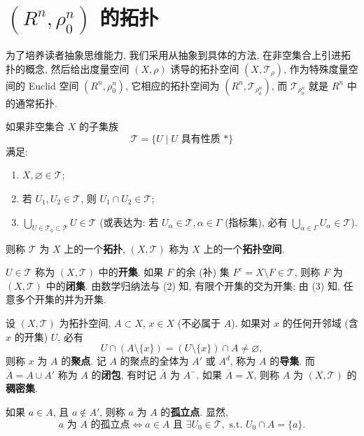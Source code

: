 
\section{\texorpdfstring{$(R^n, \rho_0^n)$}{(R^n, ρ_0^n)} 的拓扑}

为了培养读者抽象思维能力, 我们采用从抽象到具体的方法, 在非空集合上引进拓扑的概念, 然后给出度量空间 $(X, \rho)$ 诱导的拓扑空间 $(X, \mathcal{T}_{\rho})$, 作为特殊度量空间的 Euclid 空间 $(R^n, \rho_0^n)$, 它相应的拓扑空间为 $(R^n, \mathcal{T}_{\rho_0^n})$, 而 $\mathcal{T}_{\rho_0^n}$ 就是 $R^n$ 中的通常拓扑.

\begin{definition}\label{def:7.1.1}
如果非空集合 $X$ 的子集族
\[
  \mathcal{T}=\{U \mid U\text{ 具有性质 } *\}
\]
满足:
\begin{enumerate}
  \item $X, \varnothing \in \mathcal{T}$;
  \item 若 $U_1, U_2 \in \mathcal{T}$, 则 $U_1 \cap U_2 \in \mathcal{T}$;
  \item $\bigcup_{U \in \mathcal{T}_0 \subset \mathcal{T}} U \in \mathcal{T}$ (或表达为: 若 $U_\alpha \in \mathcal{T}, \alpha \in \Gamma$ (指标集), 必有 $\bigcup_{\alpha \in \Gamma} U_\alpha \in \mathcal{T}$).
\end{enumerate}
则称 $\mathcal{T}$ 为 $X$ 上的一个\textbf{拓扑}, $(X, \mathcal{T})$ 称为 $X$ 上的一个\textbf{拓扑空间}.

$U \in \mathcal{T}$ 称为 $(X, \mathcal{T})$ 中的\textbf{开集}. 如果 $F$ 的余 (补) 集 $F^c = X \setminus F \in \mathcal{T}$, 则称 $F$ 为 $(X, \mathcal{T})$ 中的\textbf{闭集}. 由数学归纳法与 (2) 知, 有限个开集的交为开集; 由 (3) 知, 任意多个开集的并为开集.
\end{definition}

\begin{definition}\label{def:7.1.2}
设 $(X, \mathcal{T})$ 为拓扑空间, $A \subset X$, $x \in X$ (不必属于 $A$). 如果对 $x$ 的任何开邻域 (含 $x$ 的开集) $U$, 必有
\[
  U \cap (A \setminus \{x\}) = (U \setminus \{x\}) \cap A \neq \varnothing,
\]
则称 $x$ 为 $A$ 的\textbf{聚点}. 记 $A$ 的聚点的全体为 $A'$ 或 $A^d$, 称为 $A$ 的\textbf{导集}. 而 $\overline{A} = A \cup A'$ 称为 $A$ 的\textbf{闭包}, 有时记 $\overline{A}$ 为 $A^-$. 如果 $\overline{A} = X$, 则称 $A$ 为 $(X, \mathcal{T})$ 的\textbf{稠密集}.

如果 $a \in A$, 且 $a \notin A'$, 则称 $a$ 为 $A$ 的\textbf{孤立点}. 显然,
\[
  a\text{ 为 } A\text{ 的孤立点} \iff a \in A\text{ 且 }\exists U_0 \in \mathcal{T},\text{ s.t. } U_0 \cap A = \{a\}.
\]
\end{definition}

